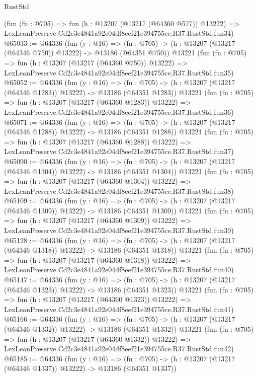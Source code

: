 \begin{lexlean}{RustStd}
\begin{coremodule}
    (fun (fn : @705) =>
    fun (h : @13207 (@13217 (@64360 @577)) @13222) =>
    LexLeanPreserve.Cd2c3e4841a92e04df8eef21e394755ce.R37.RustStd.fun34)
@65033 := @64336
    (fun (y : @16) =>
    (fn : @705) -> (h : @13207 (@13217 (@64346 @750)) @13222) -> @13186 (@64351 @750))
    @13221
    (fun (fn : @705) =>
    fun (h : @13207 (@13217 (@64360 @750)) @13222) =>
    LexLeanPreserve.Cd2c3e4841a92e04df8eef21e394755ce.R37.RustStd.fun35)
@65052 := @64336
    (fun (y : @16) =>
    (fn : @705) -> (h : @13207 (@13217 (@64346 @1283)) @13222) -> @13186 (@64351 @1283))
    @13221
    (fun (fn : @705) =>
    fun (h : @13207 (@13217 (@64360 @1283)) @13222) =>
    LexLeanPreserve.Cd2c3e4841a92e04df8eef21e394755ce.R37.RustStd.fun36)
@65071 := @64336
    (fun (y : @16) =>
    (fn : @705) -> (h : @13207 (@13217 (@64346 @1288)) @13222) -> @13186 (@64351 @1288))
    @13221
    (fun (fn : @705) =>
    fun (h : @13207 (@13217 (@64360 @1288)) @13222) =>
    LexLeanPreserve.Cd2c3e4841a92e04df8eef21e394755ce.R37.RustStd.fun37)
@65090 := @64336
    (fun (y : @16) =>
    (fn : @705) -> (h : @13207 (@13217 (@64346 @1304)) @13222) -> @13186 (@64351 @1304))
    @13221
    (fun (fn : @705) =>
    fun (h : @13207 (@13217 (@64360 @1304)) @13222) =>
    LexLeanPreserve.Cd2c3e4841a92e04df8eef21e394755ce.R37.RustStd.fun38)
@65109 := @64336
    (fun (y : @16) =>
    (fn : @705) -> (h : @13207 (@13217 (@64346 @1309)) @13222) -> @13186 (@64351 @1309))
    @13221
    (fun (fn : @705) =>
    fun (h : @13207 (@13217 (@64360 @1309)) @13222) =>
    LexLeanPreserve.Cd2c3e4841a92e04df8eef21e394755ce.R37.RustStd.fun39)
@65128 := @64336
    (fun (y : @16) =>
    (fn : @705) -> (h : @13207 (@13217 (@64346 @1318)) @13222) -> @13186 (@64351 @1318))
    @13221
    (fun (fn : @705) =>
    fun (h : @13207 (@13217 (@64360 @1318)) @13222) =>
    LexLeanPreserve.Cd2c3e4841a92e04df8eef21e394755ce.R37.RustStd.fun40)
@65147 := @64336
    (fun (y : @16) =>
    (fn : @705) -> (h : @13207 (@13217 (@64346 @1323)) @13222) -> @13186 (@64351 @1323))
    @13221
    (fun (fn : @705) =>
    fun (h : @13207 (@13217 (@64360 @1323)) @13222) =>
    LexLeanPreserve.Cd2c3e4841a92e04df8eef21e394755ce.R37.RustStd.fun41)
@65166 := @64336
    (fun (y : @16) =>
    (fn : @705) -> (h : @13207 (@13217 (@64346 @1332)) @13222) -> @13186 (@64351 @1332))
    @13221
    (fun (fn : @705) =>
    fun (h : @13207 (@13217 (@64360 @1332)) @13222) =>
    LexLeanPreserve.Cd2c3e4841a92e04df8eef21e394755ce.R37.RustStd.fun42)
@65185 := @64336
    (fun (y : @16) =>
    (fn : @705) -> (h : @13207 (@13217 (@64346 @1337)) @13222) -> @13186 (@64351 @1337))

\end{coremodule}
\end{lexlean}
